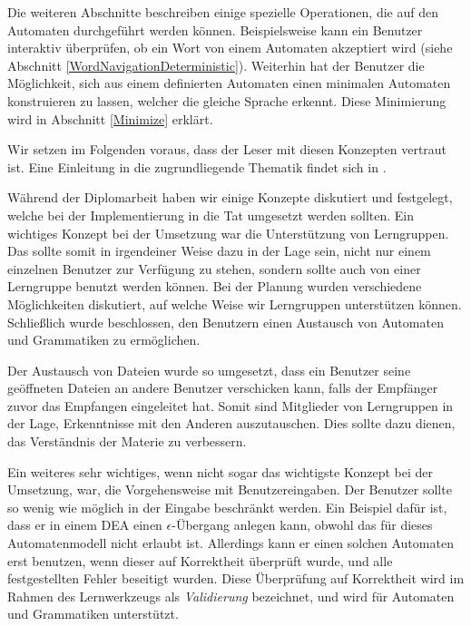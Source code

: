 Die weiteren Abschnitte beschreiben einige spezielle Operationen, die auf den
Automaten durchgeführt werden können. Beispielsweise kann ein Benutzer interaktiv
überprüfen, ob ein Wort von einem Automaten akzeptiert wird (siehe Abschnitt
\ref{WordNavigationDeterministic}). Weiterhin hat der Benutzer die Möglichkeit,
sich aus einem definierten Automaten einen minimalen Automaten konstruieren zu
lassen, welcher die gleiche Sprache erkennt. Diese Minimierung wird in Abschnitt
\ref{Minimize} erklärt.\vspace{10pt}

Wir setzen im Folgenden voraus, dass der Leser mit diesen Konzepten vertraut
ist. Eine Einleitung in die zugrundliegende Thematik findet sich in
\cite{Schoening}. \vspace{10pt}

Während der Diplomarbeit haben wir einige Konzepte diskutiert und festgelegt,
welche bei der Implementierung in die Tat umgesetzt werden sollten. Ein wichtiges Konzept
bei der Umsetzung war die Unterstützung von Lerngruppen. Das \gtitool sollte
somit in irgendeiner Weise dazu in der Lage sein, nicht nur einem einzelnen
Benutzer zur Verfügung zu stehen, sondern sollte auch von einer Lerngruppe
benutzt werden können. Bei der Planung wurden verschiedene Möglichkeiten
diskutiert, auf welche Weise wir Lerngruppen unterstützen können. Schließlich
wurde beschlossen, den Benutzern einen Austausch von Automaten und Grammatiken zu
ermöglichen.\vspace{10pt}

Der Austausch von Dateien wurde so umgesetzt, dass ein Benutzer seine geöffneten
Dateien an andere Benutzer verschicken kann, falls der Empfänger zuvor das
Empfangen eingeleitet hat. Somit sind Mitglieder von Lerngruppen in der Lage,
Erkenntnisse mit den Anderen auszutauschen. Dies sollte dazu dienen, das
Verständnis der Materie zu verbessern.\vspace{10pt}

Ein weiteres sehr wichtiges, wenn nicht sogar das wichtigste Konzept bei der
Umsetzung, war, die Vorgehensweise mit Benutzereingaben. Der Benutzer sollte so
wenig wie möglich in der Eingabe beschränkt werden. Ein Beispiel dafür ist, dass
er in einem DEA einen $\epsilon$-Übergang anlegen kann, obwohl das für dieses
Automatenmodell nicht erlaubt ist. Allerdings kann er einen solchen Automaten
erst benutzen, wenn dieser auf Korrektheit überprüft wurde, und alle
festgestellten Fehler beseitigt wurden. Diese Überprüfung auf Korrektheit wird im
Rahmen des Lernwerkzeugs als {\em Validierung} bezeichnet, und wird für Automaten
und Grammatiken unterstützt.\vspace{10pt}

